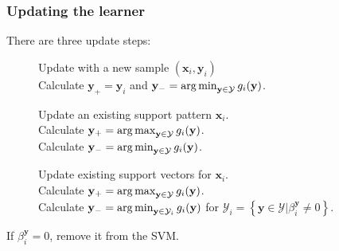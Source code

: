 %

\begin{frame}
    \frametitle{Updating the learner}
    There are three update steps:
    \begin{description}
        \item [\processNew] Update with a new sample \(\left(\mathbf{x}_i, \mathbf{y}_i\right)\) \\
            Calculate \(\mathbf{y}_+ = \mathbf{y}_i\) and \(\mathbf{y}_- = \operatorname*{arg\,min}_{\mathbf{y} \in
            \mathcal{Y}} g_i(\mathbf{y})\).
        \item [\processOld] Update an existing support pattern \(\mathbf{x}_i\). \\
            Calculate \(\mathbf{y}_+ = \operatorname*{arg\,max}_{\mathbf{y} \in \mathcal{Y}} g_i(\mathbf{y})\). \\
            Calculate \(\mathbf{y}_- = \operatorname*{arg\,min}_{\mathbf{y} \in \mathcal{Y}} g_i(\mathbf{y})\).
        \item [\optimize] Update existing support vectors for \(\mathbf{x}_i\). \\
            Calculate \(\mathbf{y}_+ = \operatorname*{arg\,max}_{\mathbf{y} \in \mathcal{Y}} g_i(\mathbf{y})\). \\
            Calculate \(\mathbf{y}_- = \operatorname*{arg\,min}_{\mathbf{y} \in \mathcal{Y}_i} g_i(\mathbf{y})\) for
            \(\mathcal{Y}_i = \left\{\mathbf{y} \in \mathcal{Y} | \beta_i^\mathbf{y} \ne 0
            \right\}\).
    \end{description}
    If \(\beta_i^\mathbf{y} = 0\), remove it from the SVM.
\end{frame}

